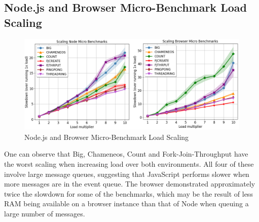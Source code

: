 \documentclass[oneside]{um-fict}
\begin{document}
\subsection{Node.js and Browser Micro-Benchmark Load Scaling}
\begin{figure}[H]
    \begin{centering}
        \includegraphics[width=\textwidth]{resources/load_scaling.png}
        \caption{Node.js and Browser Micro-Benchmark Load Scaling}\label{fig:load_scaling}
    \end{centering}
\end{figure}
One can observe that Big, Chameneos, Count and Fork-Join-Throughput have the worst scaling when increasing load over both environments. All four of these involve large message queues, suggesting that JavaScript performs slower when more messages are in the event queue. The browser demonstrated approximately twice the slowdown for some of the benchmarks, which may be the result of less RAM being available on a browser instance than that of Node when queuing a large number of messages.
\end{document}
